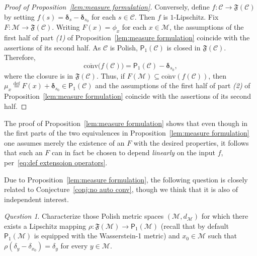 \documentclass[11pt,reqno]{amsart}
\newcommand{\bd}{\boldsymbol{\delta}}
\renewcommand{\d}{\delta}
\renewcommand{\bd}{\boldsymbol{\delta}}
\theoremstyle{remark}
\newcommand{\MM}{\mathcal{M}}
\newtheorem{question}[theorem]{Question}
\renewcommand{\subset}{\subseteq}
\newcommand{\eqdef}{\stackrel{\mathrm{def}}{=}}
\newcommand{\sub}{\mathscr{C}}
\renewcommand{\1}{\mathbf 1}
\newcommand{\conv}{\mathrm{conv}}
\begin{document}
\begin{proof}[Proof of Proposition~\ref{lem:measure formulation}]
Conversely, define $f:\sub \to \mathfrak{F}(\sub)$ by setting $f(s)=\bd_s-\bd_{s_0}$ for each $s\in \sub$. Then $f$ is $1$-Lipschitz. Fix $F:\MM\to \mathfrak{F}(\sub)$. Writing $F(x)=\phi_x$ for each $x\in \MM$, the assumptions of the first half of part {\em (1)} of  Proposition~\ref{lem:measure formulation} coincide with the assertions of its second half. As $\sub$ is Polish, $\mathsf{P}_1(\sub)$ is closed in $\mathfrak{F}(\sub)$. Therefore,
$$
\overline{\conv}\big(f(\sub)\big)=\mathsf{P}_1(\sub)-\bd_{s_0},
$$
where the closure is in $\mathfrak{F}(\sub)$. Thus, if $F(\MM)\subset \overline{\conv}(f(\sub))$, then $\mu_x\eqdef F(x)+\bd_{s_0}\in \mathsf{P}_1(\sub)$ and the assumptions of the first half of part {\em (2)} of  Proposition~\ref{lem:measure formulation} coincide with the assertions of its second half.
\end{proof}


The proof of Proposition~\ref{lem:measure formulation} shows  that even though in the first parts of the two equivalences in Proposition~\ref{lem:measure formulation}  one assumes merely the existence of an $F$ with the desired properties, it follows that such an $F$ can in fact be chosen to depend {\em linearly} on the input $f$, per~\eqref{eq:def extensoion operators}.



Due to Proposition~\ref{lem:measure formulation}, the following question is closely related to Conjecture~\ref{conj:no auto conv}, though we think that it is also of independent interest.


\begin{question}\label{Q:retract to prob}
Characterize those Polish metric spaces $(\MM,d_\MM)$ for which there exists  a Lipschitz mapping $\rho:\mathfrak{F}(\MM)\to \mathsf{P}_1(\MM)$ (recall that by default $\mathsf{P}_1(\MM)$ is equipped with the Wasserstein-1 metric) and $x_0\in \MM$ such that $\rho(\d_y-\d_{x_0})=\d_y$ for every $y\in \MM$.
\end{question}
\end{document}
